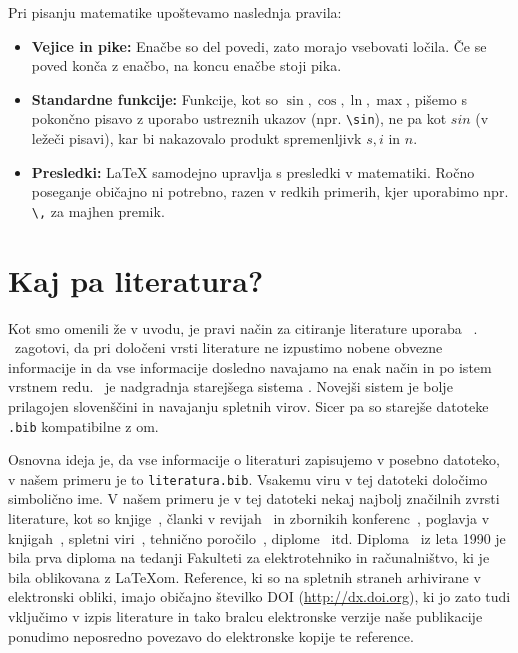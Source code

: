 \documentclass[a4paper,12pt,openright]{book}
\begin{document}
Pri pisanju matematike upoštevamo naslednja pravila:
\begin{itemize}
    \item \textbf{Vejice in pike:} Enačbe so del povedi, zato morajo vsebovati ločila. Če se poved konča z enačbo, na koncu enačbe stoji pika.
    \item \textbf{Standardne funkcije:} Funkcije, kot so $\sin, \cos, \ln, \max$, pišemo s pokončno pisavo z uporabo ustreznih ukazov (npr. \verb|\sin|), ne pa kot $sin$ (v ležeči pisavi), kar bi nakazovalo produkt spremenljivk $s, i$ in $n$.
    \item \textbf{Presledki:} \LaTeX{} samodejno upravlja s presledki v matematiki. Ročno poseganje običajno ni potrebno, razen v redkih primerih, kjer uporabimo npr. \verb|\,| za majhen premik.
\end{itemize}


\chapter{Kaj pa literatura?}
\label{ch:lit}

Kot smo omenili že v uvodu, je pravi način za citiranje literature uporaba ~\cite{biblatex}.
\BibLaTeX\ zagotovi, da pri določeni vrsti literature ne izpustimo
nobene obvezne informacije
in da vse informacije dosledno navajamo na enak način in po istem vrstnem redu.
\BibLaTeX\ je nadgradnja starejšega sistema \BibTeX. Novejši sistem je bolje prilagojen slovenščini in navajanju spletnih virov. Sicer pa so starejše datoteke \texttt{.bib} kompatibilne z \BibLaTeX om.

Osnovna ideja  je, da vse informacije o literaturi zapisujemo v posebno datoteko, v našem primeru je to \texttt{literatura.bib}.
Vsakemu viru v tej datoteki določimo simbolično ime.
V  našem primeru je v tej datoteki nekaj najbolj značilnih zvrsti literature, kot so knjige~\cite{lamport},
članki v revijah~\cite{leonardo} in zbornikih konferenc~\cite{ciuha2010visualization},
poglavja v knjigah~\cite{poglavje_springer},
spletni viri~\cite{slovarji,video},
tehnično poročilo~\cite{andersen2012kinect},
diplome~\cite{diploma} itd.
Diploma~\cite{diploma} iz leta 1990 je bila prva diploma na tedanji Fakulteti za elektrotehniko in računalništvo, ki je bila oblikovana z \LaTeX om.
Reference, ki so na spletnih straneh arhivirane v elektronski obliki, imajo običajno  \v stevilko DOI (\url{http://dx.doi.org}), ki jo zato tudi vključimo v izpis literature in tako bralcu elektronske verzije naše publikacije ponudimo neposredno povezavo do elektronske kopije te reference.
\end{document}
